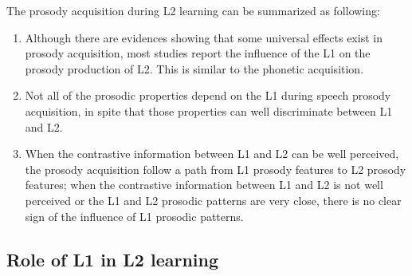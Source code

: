 The prosody acquisition during L2 learning can be summarized as following:
\begin{enumerate}
\item Although there are evidences showing that some universal effects exist in prosody acquisition, most studies report the influence of the L1 on the prosody production of L2. This is similar to the phonetic acquisition.
\item Not all of the prosodic properties depend on the L1 during speech prosody acquisition, in spite that those properties can well discriminate between L1 and L2.
\item When the contrastive information between L1 and L2 can be well perceived, the prosody acquisition follow a path from L1 prosody features to L2 prosody features; when the contrastive information between L1 and L2 is not well perceived or the L1 and L2 prosodic patterns are very close, there is no clear sign of the influence of L1 prosodic patterns.
\end{enumerate}


\subsection{Role of L1 in L2 learning}

